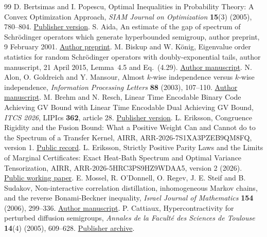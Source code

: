 \documentclass[11pt]{article}
\begin{document}
\begin{thebibliography}{99}
D. Bertsimas and I. Popescu,
Optimal Inequalities in Probability Theory: A Convex Optimization Approach,
\emph{SIAM Journal on Optimization} \textbf{15}(3) (2005), 780--804.
\href{https://doi.org/10.1137/S1052623401399903}{Publisher version}.
S. Aida, An estimate of the gap of spectrum of Schr\"odinger operators
which generate hyperbounded semigroup, author preprint, 9 February 2001.
\href{https://www.ms.u-tokyo.ac.jp/~aida/paper/preprint/handai3.pdf}{Author preprint}.
M. Biskup and W. K\"onig, Eigenvalue order statistics for random
Schr\"odinger operators with doubly-exponential tails,
author manuscript, 21 April 2015, Lemma~4.5 and Eq.~(4.29).
\href{https://www.wias-berlin.de/people/koenig/www/PPP4PAM-CMP-final.pdf}{Author manuscript}.
N. Alon, O. Goldreich and Y. Mansour,
Almost $k$-wise independence versus $k$-wise independence,
\emph{Information Processing Letters} \textbf{88} (2003), 107--110.
\href{https://www.wisdom.weizmann.ac.il/~oded/PSX/agm.pdf}{Author manuscript}.
M. Brehm and N. Resch,
Linear Time Encodable Binary Code Achieving GV Bound with Linear Time
Encodable Dual Achieving GV Bound,
\emph{ITCS 2026}, LIPIcs \textbf{362}, article 28.
\href{https://doi.org/10.4230/LIPIcs.ITCS.2026.28}{Publisher version}.
L. Eriksson,
Congruence Rigidity and the Fusion Bound: What a Positive Weight Can and
Cannot do to the Spectrum of a Transfer Kernel,
AIRR, ARR-2026-7S1XA3PZEB9QM8FQ, version 1.
\href{https://airr.science/papers/ARR-2026-7S1XA3PZEB9QM8FQ/versions/v1/}{Public record}.
L. Eriksson,
Strictly Positive Parity Laws and the Limits of Marginal Certificates:
Exact Heat-Bath Spectrum and Optimal Variance Tensorization,
AIRR, ARR-2026-5HRC3PS9HZ9WDAA5, version 2 (2026).
\href{https://airr.science/papers/ARR-2026-5HRC3PS9HZ9WDAA5/versions/v2/}{Public working paper}.
E. Mossel, R. O'Donnell, O. Regev, J. E. Steif and B. Sudakov,
Non-interactive correlation distillation, inhomogeneous Markov chains,
and the reverse Bonami-Beckner inequality,
\emph{Israel Journal of Mathematics} \textbf{154} (2006), 299--336.
\href{https://www.cs.cmu.edu/~odonnell/papers/nicd.pdf}{Author manuscript}.
P. Cattiaux, Hypercontractivity for perturbed diffusion semigroups,
\emph{Annales de la Facult\'e des Sciences de Toulouse}
\textbf{14}(4) (2005), 609--628.
\href{https://www.numdam.org/item/AFST_2005_6_14_4_609_0/}{Publisher archive}.

\end{thebibliography}
\end{document}
